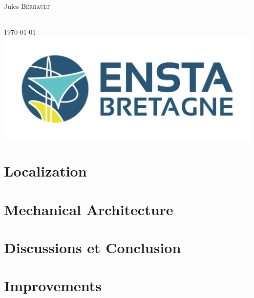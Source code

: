 \documentclass[12pt]{article}
\begin{document}
\begin{titlepage}
\begin{minipage}{0.4\textwidth}
        \begin{flushleft} \large
            Jules \textsc{Berhault}\\  %
            \end{flushleft}
\end{minipage}\\[1cm]
{\large \today}\\[1cm] %
\includegraphics{ENSTA1246-524.png}%
\vfill %

\end{titlepage}

\tableofcontents          %
\listoffigures
\listoftables
\newpage

















\section{Localization}


\section{Mechanical Architecture}


\section{Discussions et Conclusion}


\section{Improvements}




\end{document}
